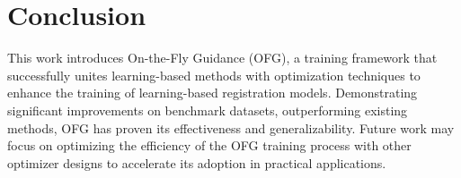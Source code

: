 \documentclass[10pt,twocolumn,letterpaper]{article}
\begin{document}
 \section{Conclusion}







This work introduces On-the-Fly Guidance (OFG), a training framework that successfully unites learning-based methods with optimization techniques to enhance the training of learning-based registration models. Demonstrating significant improvements on benchmark datasets, outperforming existing methods, OFG has proven its effectiveness and generalizability. Future work may focus on optimizing the efficiency of the OFG training process with other optimizer designs to accelerate its adoption in practical applications. {
    \small
    
    
}
\end{document}
